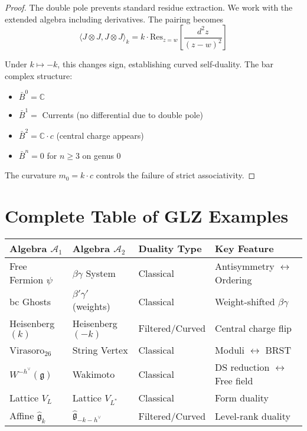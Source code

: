 \begin{proof}
The double pole prevents standard residue extraction. We work with the extended algebra including derivatives. The pairing becomes
\[
\langle J \otimes J, J \otimes J \rangle_k = k \cdot \text{Res}_{z=w}\left[\frac{d^2z}{(z-w)^2}\right]
\]
 
Under $k \mapsto -k$, this changes sign, establishing curved self-duality. The bar complex structure:
\begin{itemize}
\item $\bar{B}^0 = \mathbb{C}$
\item $\bar{B}^1 = $ Currents (no differential due to double pole)
\item $\bar{B}^2 = \mathbb{C} \cdot c$ (central charge appears)
\item $\bar{B}^n = 0$ for $n \geq 3$ on genus 0
\end{itemize}
The curvature $m_0 = k \cdot c$ controls the failure of strict associativity.
\end{proof}
 
\section{Complete Table of GLZ Examples}
 
\begin{center}
\begin{tabular}{|l|l|l|l|}
\hline
Algebra $\mathcal{A}_1$ & Algebra $\mathcal{A}_2$ & Duality Type & Key Feature \\
\hline
Free Fermion $\psi$ & $\beta\gamma$ System & Classical & Antisymmetry $\leftrightarrow$ Ordering \\
bc Ghosts & $\beta'\gamma'$ (weights) & Classical & Weight-shifted $\beta\gamma$ \\
Heisenberg$(k)$ & Heisenberg$(-k)$ & Filtered/Curved & Central charge flip \\
Virasoro$_{26}$ & String Vertex & Classical & Moduli $\leftrightarrow$ BRST \\
$W^{-h^\vee}(\mathfrak{g})$ & Wakimoto & Classical & DS reduction $\leftrightarrow$ Free field \\
Lattice $V_L$ & Lattice $V_{L^*}$ & Classical & Form duality \\
Affine $\hat{\mathfrak{g}}_k$ & $\hat{\mathfrak{g}}_{-k-h^\vee}$ & Filtered/Curved & Level-rank duality \\
\hline
\end{tabular}
\end{center}
 
